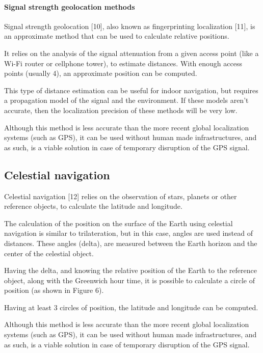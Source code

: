 \paragraph{Signal strength geolocation methods}

Signal strength geolocation [10], also known as fingerprinting localization [11], is an approximate method that can be used to calculate relative positions.

It relies on the analysis of the signal attenuation from a given access point (like a Wi-Fi router or cellphone tower), to estimate distances. With enough access points (usually 4), an approximate position can be computed.

This type of distance estimation can be useful for indoor navigation, but requires a propagation model of the signal and the environment. If these models aren't accurate, then the localization precision of these methods will be very low.

Although this method is less accurate than the more recent global localization systems (such as GPS), it can be used without human made infrastructures, and as such, is a viable solution in case of temporary disruption of the GPS signal.


\subsection{Celestial navigation}

Celestial navigation [12] relies on the observation of stars, planets or other reference objects, to calculate the latitude and longitude.

The calculation of the position on the surface of the Earth using celestial navigation is similar to trilateration, but in this case, angles are used instead of distances. These angles (delta), are measured between the Earth horizon and the center of the celestial object.

Having the delta, and knowing the relative position of the Earth to the reference object, along with the Greenwich hour time, it is possible to calculate a circle of position (as shown in Figure 6).

Having at least 3 circles of position, the latitude and longitude can be computed.

Although this method is less accurate than the more recent global localization systems (such as GPS), it can be used without human made infrastructures, and as such, is a viable solution in case of temporary disruption of the GPS signal.

